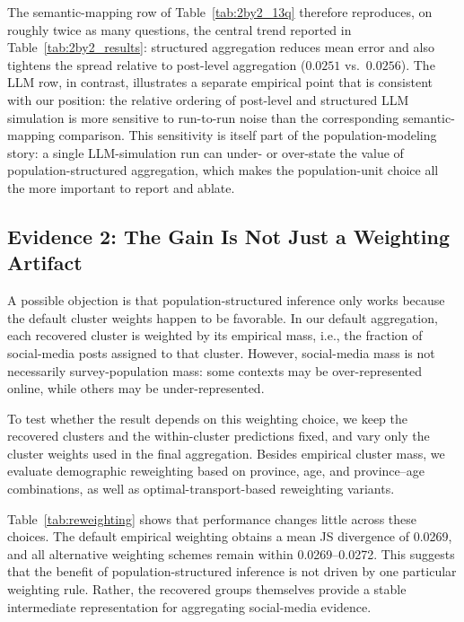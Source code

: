 \documentclass{article}
\begin{document}
The semantic-mapping row of Table~\ref{tab:2by2_13q} therefore reproduces, on
roughly twice as many questions, the central trend reported in
Table~\ref{tab:2by2_results}: structured aggregation reduces mean error and
also tightens the spread relative to post-level aggregation
($0.0251$ vs.\ $0.0256$). The LLM row, in contrast, illustrates a separate
empirical point that is consistent with our position: the relative ordering of
post-level and structured LLM simulation is more sensitive to run-to-run noise
than the corresponding semantic-mapping comparison. This sensitivity is
itself part of the population-modeling story: a single LLM-simulation run can
under- or over-state the value of population-structured aggregation, which
makes the population-unit choice all the more important to report and ablate.

\subsection{Evidence 2: The Gain Is Not Just a Weighting Artifact}
\label{clustering_scheme}

A possible objection is that population-structured inference only works because the
default cluster weights happen to be favorable.
In our default aggregation, each recovered cluster is weighted by its empirical mass,
i.e., the fraction of social-media posts assigned to that cluster.
However, social-media mass is not necessarily survey-population mass: some contexts may
be over-represented online, while others may be under-represented.

To test whether the result depends on this weighting choice, we keep the recovered
clusters and the within-cluster predictions fixed, and vary only the cluster weights used
in the final aggregation.
Besides empirical cluster mass, we evaluate demographic reweighting based on province,
age, and province--age combinations, as well as optimal-transport-based reweighting
variants.

Table~\ref{tab:reweighting} shows that performance changes little across these choices.
The default empirical weighting obtains a mean JS divergence of 0.0269, and all
alternative weighting schemes remain within 0.0269--0.0272.
This suggests that the benefit of population-structured inference is not driven by one
particular weighting rule.
Rather, the recovered groups themselves provide a stable intermediate representation for
aggregating social-media evidence.
\end{document}

